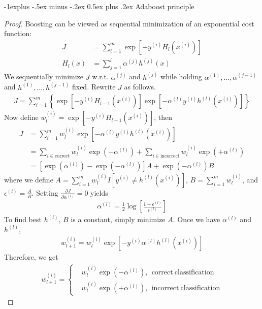 \documentclass[8pt,landscape]{article}
\makeatletter
\renewcommand{\subsection}{\@startsection{subsection}{2}{0mm}%
                                {-1explus -.5ex minus -.2ex}%
                                {0.5ex plus .2ex}%
                                {\normalfont\small\bfseries}}
\makeatother
\begin{document}
\begin{multicols}{3}
\subsection{Adaboost principle}
\begin{proof}
	Boosting can be viewed as sequential minimization of an exponential cost function:
	\begin{align*}
		J &= \sum_{i=1}^m \exp{\left[ -y^{(i)} H_l(x^{(i)}) \right]}\\
		H_l(x) &= \sum_{j=1}^l \alpha^{(j)} h^{(j)}(x)
	\end{align*}
	We sequentially minimize $J$ w.r.t. $\alpha^{(j)}$ and $h^{(j)}$ while holding $\alpha^{(1)}, ..., \alpha^{(j-1)}$ and $h^{(1)}, ..., h^{(j-1)}$ fixed. Rewrite $J$ as follows.
	\begin{align*}
		J = \sum_{i=1}^m \left\{ \exp{\left[ -y^{(i)} H_{l-1}(x^{(i)}) \right]} \exp{\left[ -\alpha^{(l)} y^{(i)} h^{(l)}(x^{(i)}) \right]} \right\}
	\end{align*}
	Now define $w_l^{(i)} = \exp{\left[ -y^{(i)} H_{l-1}(x^{(i)}) \right]}$, then
	\begin{align*}
		J &= \sum_{i=1}^m w_l^{(i)} \exp{\left[ -\alpha^{(l)} y^{(i)} h^{(l)}(x^{(i)}) \right]}\\
		&= \sum_{i \in \mathrm{correct}} w_l^{(i)} \exp{\left( -\alpha^{(l)} \right)} + \sum_{i \in \mathrm{incorrect}} w_l^{(i)} \exp{\left( +\alpha^{(l)} \right)}\\
		&= \left[ \exp{\left( \alpha^{(l)} \right)} - \exp{\left( -\alpha^{(l)} \right)} \right] A + \exp{\left( -\alpha^{(l)} \right)} B
	\end{align*}
	where we define $A = \sum_{i=1}^m w_l^{(i)} I \left[ y^{(i)} \neq h^{(l)}(x^{(i)}) \right]$, $B = \sum_{i=1}^m w_l^{(i)}$, and $\epsilon^{(l)} = \frac{A}{B}$. Setting $\frac{\partial J}{\partial \alpha^{(l)}} = 0$ yields
	\begin{align*}
		\alpha^{(l)} = \frac{1}{2}\log{ \left[ \frac{1 - \epsilon^{(l)}}{\epsilon^{(l)}} \right] }
	\end{align*}
	To find best $h^{(l)}$, $B$ is a constant, simply minimize $A$. Once we have $\alpha^{(l)}$ and $h^{(l)}$,
	\begin{align*}
		w_{l+1}^{(i)} = w_l^{(i)} \exp{ \left[ -y^{(i)} \alpha^{(l)} h^{(l)}(x^{(i)}) \right] }
	\end{align*}
	Therefore, we get
	\begin{align*}
		w_{l+1}^{(i)} = \left\{
		\begin{aligned}
			&w_l^{(i)} \exp{\left( -\alpha^{(l)} \right)}, \ \ \mathrm{correct \ classification}\\
			&w_l^{(i)} \exp{\left( +\alpha^{(l)} \right)}, \ \ \mathrm{incorrect \ classification}
		\end{aligned}
		\right.
	\end{align*}
\end{proof}


\end{multicols}
\end{document}
